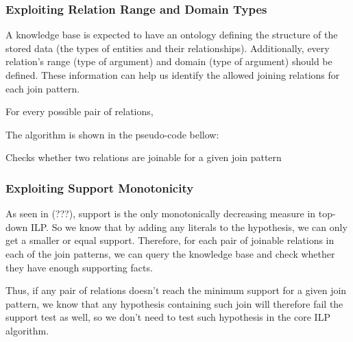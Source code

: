 \subsubsection{Exploiting Relation Range and Domain Types}

A knowledge base is expected to have an ontology defining the structure of the stored data (the types of entities and their relationships). Additionally, every relation's range (type of  argument) and domain (type of  argument) should be defined. These information can help us identify the allowed joining relations for each join pattern.

For every possible pair of relations, 

The algorithm is shown in the pseudo-code bellow:

\begin{algorithm}[!h]
 \caption{Checks whether two relations are joinable for a given join pattern}
 \label{alg1}
   {
  }
   {
  }
\end{algorithm}

\subsubsection{Exploiting Support Monotonicity}

As seen in (???), support is the only monotonically decreasing measure in top-down ILP. So we know that by adding any literals to the hypothesis, we can only get a smaller or equal support. Therefore, for each pair of joinable relations in each of the join patterns, we can query the knowledge base and check whether they have enough supporting facts.

Thus, if any pair of relations doesn't reach the minimum support for a given join pattern, we know that any hypothesis containing such join will therefore fail the support test as well, so we don't need to test such hypothesis in the core ILP algorithm.


